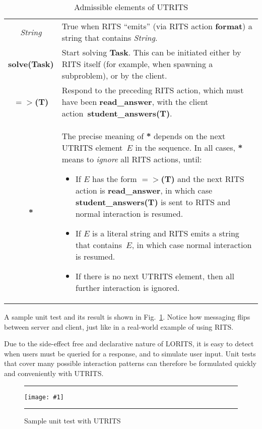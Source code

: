 \documentclass[a4paper,11pt]{article}
\newcommand{\pslisting}[1]{\hrule\vskip0.2cm\texttt{[image: \#1]}\vskip0.2cm\hrule}
\begin{document}
\begin{table}[ht]
  \centering
  \begin{tabular}{cp{8.5cm}}
    \hline
    \textit{String} & True when RITS ``emits'' (via RITS action \textbf{format}) a string that contains \textit{String}. \\
    \textbf{solve(Task)} & Start solving \textbf{Task}. This can be initiated either by RITS itself (for example, when spawning a subproblem), or by the client.\\
    \textbf{$=>$(T)} & Respond to the preceding RITS action, which must have been \textbf{read\_answer}, with the client action~\textbf{student\_answers(T)}. \\
    \textbf{*} & The precise meaning of \textbf{*} depends on the next UTRITS element~$E$ in the sequence. In all cases, \textbf{*} means to \textit{ignore} all RITS actions, until:
    \begin{itemize}
    \item If $E$ has the form \textbf{$=>$(T)} and the next RITS action is \textbf{read\_answer}, in which case \textbf{student\_answers(T)} is sent to RITS and normal interaction is resumed.
    \item If $E$ is a literal string and RITS emits a string that contains~$E$, in which case normal interaction is resumed.
    \item If there is no next UTRITS element, then all further interaction is ignored.
    \end{itemize}\\
    \hline
  \end{tabular}
\caption{Admissible elements of UTRITS}
  \label{tab:utrits}
\end{table}

A sample unit test and its result is shown in Fig.~\ref{snip:utrits}.
Notice how messaging flips between server and client, just like in
a real-world example of using RITS.

Due to the side-effect free and declarative nature of LORITS, it is
easy to detect when users must be queried for a response, and to
simulate user input. Unit tests that cover many possible interaction
patterns can therefore be formulated quickly and conveniently with
UTRITS.


\begin{figure}[ht]
  \centering
  \pslisting{utrits.ps}
  \caption{Sample unit test with UTRITS}
  \label{snip:utrits}
\end{figure}

\vfil
\end{document}
